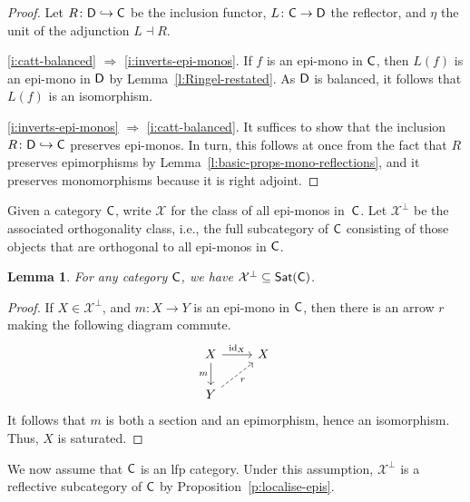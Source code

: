 \documentclass[a4paper,10pt,reqno]{amsart}
\newtheorem{lemma}[theorem]{Lemma}
\theoremstyle{definition}
\theoremstyle{remark}
\newcommand{\cat}{{\sf C}}								%
\newcommand{\catt}{{\sf D}}								%
\newcommand{\Sat}{{\sf Sat}}								%
\newcommand{\ar}[1]{\mathcal{#1}}							%
\newcommand{\X}{\ar{X}}									%
\newcommand{\id}{\mathrm{id}}								%
\newcommand{\into}{\hookrightarrow}						%
\newcommand{\ort}[1]{{#1}^{\perp}}						%
\newcommand{\IMP}{\Rightarrow}						%
\begin{document}
\begin{proof}
Let $R\colon \catt\into\cat$ be the inclusion functor, $L\colon \cat\to\catt$ the reflector, and $\eta$ the unit of the adjunction $L\dashv R$.

\ref{i:catt-balanced} $\IMP$ \ref{i:inverts-epi-monos}. If $f$ is an epi-mono in $\cat$, then $L(f)$ is an epi-mono in $\catt$ by Lemma~\ref{l:Ringel-restated}. As $\catt$ is balanced, it follows that $L(f)$ is an isomorphism.

\ref{i:inverts-epi-monos} $\IMP$ \ref{i:catt-balanced}. It suffices to show that the inclusion $R\colon \catt\into\cat$ preserves epi-monos. In turn, this follows at once from the fact that $R$ preserves epimorphisms by Lemma~\ref{l:basic-props-mono-reflections}, and it preserves monomorphisms because it is right adjoint.
\end{proof}

Given a category $\cat$, write $\X$ for the class of all epi-monos in~$\cat$. Let $\ort{\X}$ be the associated orthogonality class, i.e., the full subcategory of $\cat$ consisting of those objects that are orthogonal to all epi-monos in $\cat$. 

\begin{lemma}\label{l:ort-included-in-sigma}
For any category $\cat$, we have $\ort{\X}\subseteq \Sat(\cat)$.
\end{lemma}

\begin{proof}
If $X\in \ort{\X}$, and $m\colon X\to Y$ is an epi-mono in $\cat$, then there is an arrow $r$ making the following diagram commute.
\[\begin{tikzcd}
X \arrow{d}[swap]{m} \arrow{r}{\id_{X}} & X \\
Y \arrow[dashed]{ur}[swap]{r}
\end{tikzcd}\]
It follows that $m$ is both a section and an epimorphism, hence an isomorphism. Thus, $X$ is saturated.
\end{proof}

We now assume that $\cat$ is an lfp category. Under this assumption, $\ort{\X}$ is a reflective subcategory of $\cat$ by Proposition~\ref{p:localise-epis}. 
\end{document}
